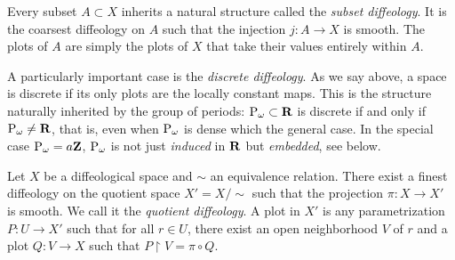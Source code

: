 \documentclass[10pt,reqno,letterpaper,twoside]{amsbook}
\begin{document}
  \begin{article}
    Every subset $A \subset X$ inherits a natural structure called the \emph{subset diffeology}.
    It is the coarsest diffeology on $A$ such that the injection $j : A \to X$ is smooth.
    The plots of $A$ are simply the plots of $X$ that take their values entirely within $A$.
    
    A particularly important case is the \emph{discrete diffeology}.
    As we say above,
    a space is discrete if its only plots are the locally constant maps.
    This is the structure naturally inherited by the group of periods:
    $\operatorname{P}_\omega \subset {\mathbf{R}}$ is discrete if and only if $\operatorname{P}_\omega \neq {\mathbf{R}}$,
    that is,
    even when $\operatorname{P}_\omega$ is dense which the general case.
    In the special case $\operatorname{P}_\omega = a {\mathbf{Z}}$,
    $\operatorname{P}_\omega$ is not just \emph{induced} in ${\mathbf{R}}$ but \emph{embedded},
    see below.
  \end{article}
  
  
  \begin{article}
    Let $X$ be a diffeological space and $\sim$ an equivalence relation.
    There exist a finest diffeology on the quotient space $X' = X/\!\!\sim$ such that the projection $\pi : X \to X'$ is smooth.
    We call it the \emph{quotient diffeology}.
    A plot in $X'$ is any parametrization $P : U \to X'$ such that for all $r \in U$,
    there exist an open neighborhood $V$ of $r$ and a plot $Q : V \to X$ such that $P \restriction V = \pi \circ Q$.
  \end{article}
  
\end{document}
